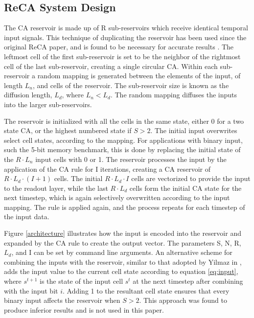 \documentclass{elsarticle}
\begin{document}
\begin{multicols}{2}
\subsection{ReCA System Design}
The CA reservoir is made up of R sub-reservoirs which receive identical 
temporal input signals. This technique of duplicating the reservoir has been 
used since the original ReCA paper, and is found to be necessary for accurate 
results \cite{yilmaz2014reservoir}.
The leftmost cell of the first sub-reservoir is set to be the 
neighbor of the rightmost cell of the last sub-reservoir, creating a single 
circular CA.  Within each sub-reservoir a random mapping is generated between 
the elements of the input, of length $L_{n}$, and cells of the reservoir. The 
sub-reservoir size is known as the diffusion length, $L_{d}$, where $L_{n} < 
L_{d}$. The random mapping diffuses the inputs into the larger sub-reservoirs.  
\par The reservoir is initialized with all the cells in the same state, either 
0 for a two state CA, or the highest numbered state if $S > 2$. The initial 
input overwrites select cell states, according to the mapping. For applications 
with binary input, such the 5-bit memory benchmark, this is done by replacing 
the initial state of the $R \cdot L_{n}$ input cells with 0 or 1.  The 
reservoir processes the input by the application of the CA rule for I 
iterations, creating a CA reservoir of $R \cdot L_{d} \cdot (I + 1)$ cells.  
The initial $R \cdot L_{d} \cdot I$ cells are vectorized to provide the input 
to the readout layer, while the last $R \cdot L_{d}$ cells form the initial CA 
state for the next timestep, which is again selectively overwritten according 
to the input mapping. The rule is applied again, and the process repeats for 
each timestep of the input data.  \par  


Figure \ref{architecture} illustrates how the input is encoded into the 
reservoir and expanded by the CA rule to create the output vector.  The 
parameters S, N, R, $L_{d}$, and I can be set by command line arguments. An 
alternative scheme for combining the inputs with the reservoir, similar to that 
adopted by Yilmaz in \cite{yilmaz2015connectionist}, adds the input value to 
the current cell state according to equation \ref{eq:input}, where $s^{t+1}$ is 
the state of the input cell $s^t$ at the next timestep after combining with the 
input bit $i$.  Adding 1 to the resultant cell state ensures that every binary 
input affects the reservoir when $S > 2$.  This approach was found to produce 
inferior results and is not used in this paper.


\end{multicols}
\end{document}
